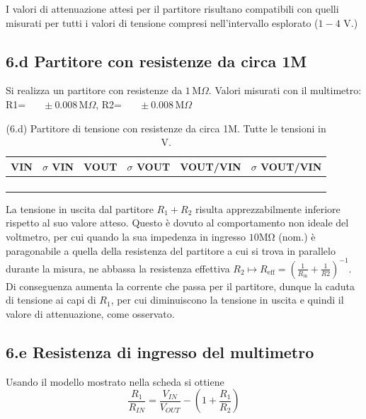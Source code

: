 \documentclass[10pt,a4paper]{article}
\newcommand{\exn}{\phantom{xxx}}
\begin{document}
I valori di attenuazione attesi per il partitore risultano compatibili
con quelli misurati per tutti i valori di tensione compresi nell'intervallo
esplorato ($1 - 4$ V.)

\subsection*{6.d Partitore con resistenze da circa 1M}
\par
Si realizza un partitore con resistenze da $1 \,\mathrm{M}\Omega$.
Valori misurati con il multimetro: R1=$\exn \pm 0.008 \,\mathrm{M}\Omega$,
R2=$\exn \pm 0.008 \,\mathrm{M}\Omega$


\begin{table}[h]
\centering
\begin{tabular}{|c|c|c|c|c|c|}
\hline 
VIN& $\sigma$ VIN  &VOUT	 & $\sigma$ VOUT& VOUT/VIN & $\sigma$ VOUT/VIN \\
\hline 
\exn & \exn & \exn & \exn & \exn &\exn \\
\exn & \exn & \exn & \exn & \exn &\exn \\
\exn & \exn & \exn & \exn & \exn &\exn \\
\exn & \exn & \exn & \exn & \exn &\exn \\
\hline 
\end{tabular} 
\caption{(6.d) Partitore di tensione con resistenze da circa 1M.
Tutte le tensioni in V.\label{t:par2}}
\end{table}

La tensione in uscita dal partitore $R_1 + R_2$ risulta apprezzabilmente
inferiore rispetto al suo valore atteso. Questo è dovuto al comportamento
non ideale del voltmetro, per cui quando la sua impedenza in ingresso
$10 \si{\Mohm}$ (nom.) è paragonabile a quella della resistenza del partitore
a cui si trova in parallelo durante la misura, ne abbassa la resistenza
effettiva $R_2 \mapsto R_{\mathrm{eff}} = (\frac{1}{R_{\mathrm{in}}}
+ \frac{1}{R2})^{-1}$. Di conseguenza aumenta la corrente che passa per
il partitore, dunque la caduta di tensione ai capi di $R_1$, per cui
diminuiscono la tensione in uscita e quindi il valore di attenuazione, come
osservato.


\subsection*{6.e Resistenza di ingresso del multimetro}
Usando il modello mostrato nella scheda si ottiene
\begin{equation}\label{eq: divider}
\frac{R_1}{R_{IN}} =  \frac{V_{IN}}{V_{OUT}} - (1 +  \frac{R_1}{R_2} )
\end{equation}
\end{document}
